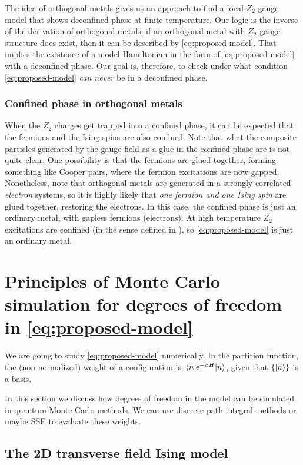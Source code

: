 \documentclass[hyperref, a4paper]{article}
\newcommand*{\ee}{\mathrm{e}}
\newcommand*{\Ztwo}{\texorpdfstring{$\mathbb{Z}_2$ }{Z2 }}
\newcommand*{\tfim}{transverse field Ising model}
\def\mathbb#1{#1}%
\begin{document}
The idea of orthogonal metals gives us an approach to find a local \Ztwo gauge model that shows deconfined phase at finite temperature.
Our logic is the inverse of the derivation of orthogonal metals: if an orthogonal metal with \Ztwo gauge structure does exist, then it can be described by \eqref{eq:proposed-model}.
That implies the existence of a model Hamiltonian in the form of \eqref{eq:proposed-model} with a deconfined phase.
Our goal is, therefore, to check under what condition \eqref{eq:proposed-model} \emph{can never} be in a deconfined phase.

\subsubsection{Confined phase in orthogonal metals}

When the \Ztwo charges get trapped into a confined phase, it can be expected that the fermions and the Ising spins are also confined.
Note that what the composite particles generated by the gauge field as a glue in the confined phase are is not quite clear.
One possibility is that the fermions are glued together, forming something like Cooper pairs, where the fermion excitations are now gapped.
Nonetheless, note that orthogonal metals are generated in a strongly correlated \emph{electron} systems, so it is highly likely that \emph{one fermion and one Ising spin} are glued together, restoring the electrons.
In this case, the confined phase is just an ordinary metal, with gapless fermions (electrons).
At high temperature \Ztwo excitations are confined (in the sense defined in ), so \eqref{eq:proposed-model} is just an ordinary metal.

\section{Principles of Monte Carlo simulation for degrees of freedom in \eqref{eq:proposed-model}}

We are going to study \eqref{eq:proposed-model} numerically.
In the partition function, the (non-normalized) weight of a configuration is $\mel{n}{\ee^{-\beta H}}{n}$, given that $\{\ket{n}\}$ is a basis.

In this section we discuss how degrees of freedom in the model can be simulated in quantum Monte Carlo methods.
We can use discrete path integral methods or maybe SSE to evaluate these weights.

\subsection{The 2D \tfim{}}
\end{document}
